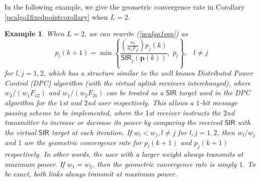 \documentclass[10pt,twocolumn]{IEEEtran}
\newcommand{\0}{\mathbf{0}}
\newcommand{\1}{\mathbf{1}}
\newcommand{\trans}{^\top}
\newtheorem{example}{Example}
\begin{document}
In the following example, we give the geometric convergence rate in Corollary \ref{pcalgo1fixedpointcorollary} when $L=2$.
\begin{example}
When $L=2$, we can rewrite (\ref{pcalgo1eqn}) as
\begin{equation}
\label{2usersapcfixedpoint}
p_l(k+1)=\min \left\{ \frac{(\frac{w_l}{w_j F_{jl}})p_j(k)}{\mathsf{SIR}_j(\mathbf{p}(k))}, \; \bar{p}_l \right\}, \;\;\; l \ne j
\end{equation}
for $l,j=1,2$, which has a structure similar to the well known Distributed Power Control (DPC) algorithm \cite{Foschini93} (with the virtual uplink receivers interchanged), where $w_2/(w_1 F_{12})$ and $w_1/(w_2 F_{21})$ can be treated as a $\mathsf{SIR}$ target used in the DPC algorithm for the $1$st and $2$nd user respectively. This allows a $1$-bit message passing scheme to be implemented, where the $1$st receiver instructs the $2$nd transmitter to increase or decrease its power by comparing the received $\mathsf{SIR}$ with the virtual $\mathsf{SIR}$ target at each iteration. If $w_l < w_j, l \ne j$ for $l,j=1,2$, then $w_l/w_j$ and $1$ are the geometric convergence rate for $p_l(k+1)$ and $p_j(k+1)$ respectively. In other words, the user with a larger weight always transmits at maximum power. If $w_1=w_2$, then the geometric convergence rate is simply $1$. To be exact, both links always transmit at maximum power. 
\end{example}
\end{document}

